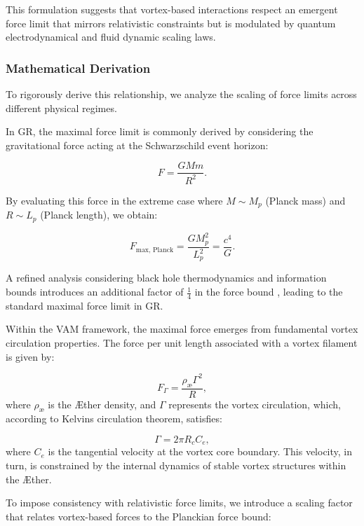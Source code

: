 This formulation suggests that vortex-based interactions respect an emergent force limit that mirrors relativistic constraints but is modulated by quantum electrodynamical and fluid dynamic scaling laws.


\subsubsection*{Mathematical Derivation}
To rigorously derive this relationship, we analyze the scaling of force limits across different physical regimes.


In GR, the maximal force limit is commonly derived by considering the gravitational force acting at the Schwarzschild event horizon:


\begin{equation*}
F = \frac{GMm}{R^2}.
\end{equation*}


By evaluating this force in the extreme case where $M \sim M_p$ (Planck mass) and $R \sim L_p$ (Planck length), we obtain:


\begin{equation*}
F_\text{max, Planck} = \frac{G M_p^2}{L_p^2} = \frac{c^4}{G}.
\end{equation*}


A refined analysis considering black hole thermodynamics and information bounds introduces an additional factor of $\frac{1}{4}$ in the force bound \cite{Gibbons2002}, leading to the standard maximal force limit in GR.


Within the VAM framework, the maximal force emerges from fundamental vortex circulation properties. The force per unit length associated with a vortex filament is given by:


\begin{equation*}
F_{\Gamma} = \frac{\rho_\text{\ae} \Gamma^2}{R},
\end{equation*}
where $\rho_\text{\ae}$ is the Æther density, and $\Gamma$ represents the vortex circulation, which, according to Kelvin\rqs s circulation theorem, satisfies:


\begin{equation*}
\Gamma = 2\pi R_c C_e,
\end{equation*}
where $C_e$ is the tangential velocity at the vortex core boundary. This velocity, in turn, is constrained by the internal dynamics of stable vortex structures within the Æther.


To impose consistency with relativistic force limits, we introduce a scaling factor that relates vortex-based forces to the Planckian force bound:


